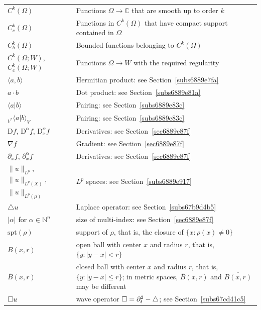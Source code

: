 \documentclass[a4paper,9pt]{amsart}
\newcommand{\N}{\mathbb{N}}	%
\newcommand{\C}{\mathbb{C}}	%
\newcommand{\de}{\partial}		%
\newcommand{\Diff}{\mathrm{D}}
\newcommand{\spt}{\mathrm{spt}}
\newcommand{\laplacian}{\triangle}
\newcommand{\grad}{\nabla}
\newcommand{\abs}[1]{\left\lvert #1 \right\rvert}
\theoremstyle{plain}
\theoremstyle{definition}
\theoremstyle{remark}
\begin{document}
\begin{tabular}{p{2cm}@{ : }p{9cm}}
$C^k(\Omega)$ 
	& Functions $\Omega\to\C$ that are smooth up to order $k$ \\
$C^k_c(\Omega)$ 
	& Functions in $C^k(\Omega)$ that have compact support contained in $\Omega$\\
$C^k_b(\Omega)$
	& Bounded functions belonging to $C^k(\Omega)$ \\
$C^k(\Omega;W)$, $C^k_c(\Omega;W)$ 
	& Functions $\Omega\to W$ with the required regularity\\
$\langle a,b \rangle$
	& Hermitian product: see Section~\ref{subs6889e7fa} \\
$a\cdot b$
	& Dot product: see Section~\ref{subs6889e81a} \\
$\langle a|b \rangle$
	& Pairing: see Section~\ref{subs6889e83c} \\
${}_{V^*}\langle a|b \rangle_V$
	& Pairing: see Section~\ref{subs6889e83c} \\
$\Diff f$, $\Diff^\alpha f$, $\Diff^\alpha_x f$
	& Derivatives: see Section~\ref{sec6889e87f} \\
$\grad f$
	& Gradient: see Section~\ref{sec6889e87f} \\
$\de_x f$, $\de_x^\alpha f$
	& Derivatives: see Section~\ref{sec6889e87f} \\
$\|u\|_{L^p}$, $\|u\|_{L^p(X)}$, $\|u\|_{L^p(\mu)}$
	& $L^p$ spaces: see Section~\ref{subs6889e917} \\
$\laplacian u$
	& Laplace operator: see Section~\ref{subs67b9d4b5} \\
$\abs{\alpha}$ for $\alpha\in\N^n$
	& size of multi-index: see Section~\ref{sec6889e87f} \\
$\spt(\rho)$
	& support of $\rho$, that is, the closure of $\{x:\rho(x)\neq0\}$ \\
$B(x,r)$
	& open ball with center $x$ and radius $r$, that is, $\{y: |y-x|<r\}$ \\
$\bar B(x,r)$
	& closed ball with center $x$ and radius $r$, that is, $\{y: |y-x|\le r\}$; in metric spaces, $\bar B(x,r)$ and $\overline{ B(x,r)}$ may be different \\
$\square u$
	& wave operator $\waveop = \de_t^2-\laplacian$; see Section~\ref{subs67cd41c5}\\
\end{tabular}


\printindex
\printbibliography

\newpage
\end{document}
